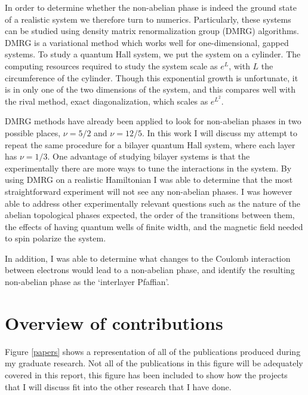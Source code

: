 In order to determine whether the non-abelian phase is indeed the ground state of a realistic system we therefore turn to numerics. Particularly, these systems can be studied using density matrix renormalization group (DMRG) algorithms\cite{Zaletel}. DMRG is a variational method which works well for one-dimensional, gapped systems. To study a quantum Hall system, we put the system on a cylinder. The computing resources required to study the system scale as $e^L$, with $L$ the circumference of the cylinder. Though this exponential growth is unfortunate, it is in only one of the two dimensions of the system, and this compares well with the rival method, exact diagonalization, which scales as $e^{L^2}$. 

DMRG methods have already been applied to look for non-abelian phases in two possible places, $\nu=5/2$ and $\nu=12/5$. In this work I will discuss my attempt to repeat the same procedure for a bilayer quantum Hall system, where each layer has $\nu=1/3$. One advantage of studying bilayer systems is that the experimentally there are more ways to tune the interactions in the system. By using DMRG on a realistic Hamiltonian I was able to determine that the most straightforward experiment will not see any non-abelian phases. I was however able to address other experimentally relevant questions such as the nature of the abelian topological phases expected, the order of the transitions between them, the effects of having quantum wells of finite width, and the magnetic field needed to spin polarize the system.

In addition, I was able to determine what changes to the Coulomb interaction between electrons would lead to a non-abelian phase, and identify the resulting non-abelian phase as the `interlayer Pfaffian'.

\section{Overview of contributions}

Figure \ref{papers} shows a representation of all of the publications produced during my graduate research. Not all of the publications in this figure will be adequately covered in this report, this figure has been included to show how the projects that I will discuss fit into the other research that I have done. 

